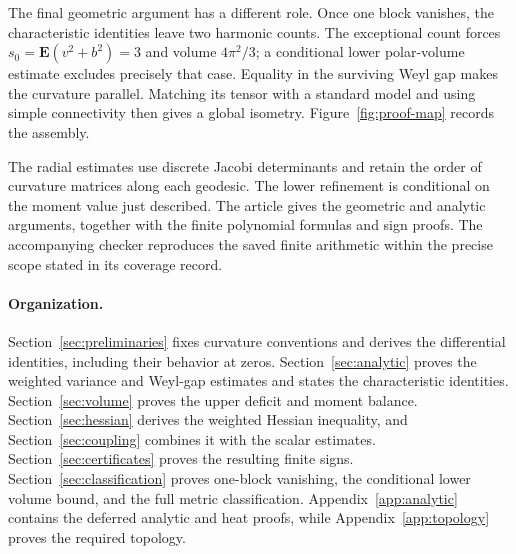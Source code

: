 The final geometric argument has a different role. Once one block
vanishes, the characteristic identities leave two harmonic counts. The
exceptional count forces $s_0=\mathbf E(v^2+b^2)=3$ and volume
$4\pi^2/3$; a conditional lower polar-volume estimate excludes precisely
that case. Equality in the surviving Weyl gap makes the curvature
parallel. Matching its tensor with a standard model and using simple
connectivity then gives a global isometry. Figure~\ref{fig:proof-map}
records the assembly.



The radial estimates use discrete Jacobi determinants and retain the
order of curvature matrices along each geodesic. The lower refinement is
conditional on the moment value just described. The article gives the
geometric and analytic arguments, together with the finite polynomial
formulas and sign proofs. The accompanying checker reproduces the saved
finite arithmetic within the precise scope stated in its coverage record.

\paragraph{Organization.}
Section~\ref{sec:preliminaries} fixes curvature conventions and derives
the differential identities, including their behavior at zeros.
Section~\ref{sec:analytic} proves the weighted variance and Weyl-gap
estimates and states the characteristic identities.
Section~\ref{sec:volume} proves the upper deficit and moment balance.
Section~\ref{sec:hessian} derives the weighted Hessian inequality, and
Section~\ref{sec:coupling} combines it with the scalar estimates.
Section~\ref{sec:certificates} proves the resulting finite signs.
Section~\ref{sec:classification} proves one-block vanishing, the
conditional lower volume bound, and the full metric classification.
Appendix~\ref{app:analytic} contains the deferred analytic and heat
proofs, while Appendix~\ref{app:topology} proves the required topology.
